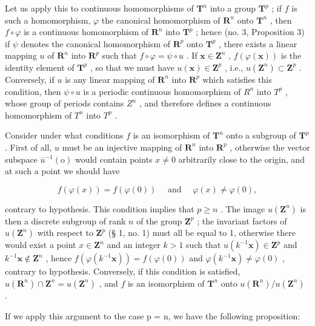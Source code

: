 Let us apply this to continuous homomorphisms of \(\mathbf{T}^n\) into a group \(\mathbf{T}^p\) ; if \(f\) is such a homomorphism, \(\varphi\) the canonical homomorphism of \(\mathbf{R}^n\) onto \(\mathbf{T}^n\) , then \(f \circ \varphi\) is a continuous homomorphism of \(\mathbf{R}^n\) into \(\mathbf{T}^p\) ; hence (no. 3, Proposition 3) if \(\psi\) denotes the canonical homomorphism of \(\mathbf{R}^p\) onto \(\mathbf{T}^p\) , there exists a linear mapping \(u\) of \(\mathbf{R}^n\) into \(\mathbf{R}^p\) such that \(f \circ \varphi = \psi \circ u\) . If \(\boldsymbol{x} \in \mathbf{Z}^n\) , \(f(\varphi(\boldsymbol{x}))\) is the identity element of \(\mathbf{T}^p\) , so that we must have \(u(\boldsymbol{x}) \in \mathbf{Z}^p\) , i.e., \(u(\mathbf{Z}^n) \subset \mathbf{Z}^p\) . Conversely, if \(u\) is any linear mapping of \(\mathbf{R}^n\) into \(\mathbf{R}^p\) which satisfies this condition, then \(\psi \circ u\) is a periodic continuous homomorphism of \(R^n\) into \(T^p\) , whose group of periods contains \(Z^n\) , and therefore defines a continuous homomorphism of \(T^n\) into \(T^p\) .

Consider under what conditions \(f\) is an isomorphism of \(\mathbf{T}^n\) onto a subgroup of \(\mathbf{T}^p\) . First of all, \(u\) must be an injective mapping of \(\mathbf{R}^n\) into \(\mathbf{R}^p\) , otherwise the vector subspace \(\overline{u}^{-1}(\mathrm{o})\) would contain points \(x \neq 0\) arbitrarily close to the origin, and at such a point we should have

\[
f (\varphi (x)) = f (\varphi (0)) \quad \text { and } \quad \varphi (x) \neq \varphi (0),
\]

contrary to hypothesis. This condition implies that \(p \geqslant n\) . The image \(u(\mathbf{Z}^n)\) is then a discrete subgroup of rank \(n\) of the group \(\mathbf{Z}^p\) ; the invariant factors of \(u(\mathbf{Z}^n)\) with respect to \(\mathbf{Z}^p\) (§ 1, no. 1) must all be equal to 1, otherwise there would exist a point \(x \in \mathbf{Z}^n\) and an integer \(k > 1\) such that \(u(k^{-1}\mathbf{x}) \in \mathbf{Z}^p\) and \(k^{-1}\mathbf{x} \notin \mathbf{Z}^n\) , hence \(f(\varphi(k^{-1}\mathbf{x})) = f(\varphi(0))\) and \(\varphi(k^{-1}\mathbf{x}) \neq \varphi(0)\) , contrary to hypothesis. Conversely, if this condition is satisfied, \(u(\mathbf{R}^n) \cap \mathbf{Z}^n = u(\mathbf{Z}^n)\) , and \(f\) is an isomorphism of \(\mathbf{T}^n\) onto \(u(\mathbf{R}^n)/u(\mathbf{Z}^n)\) .

If we apply this argument to the case p = n, we have the following proposition:

